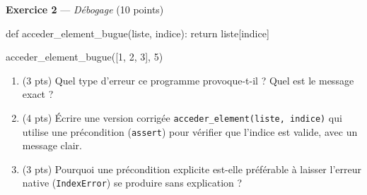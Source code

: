 \bigskip

\textbf{Exercice 2} --- \textit{Débogage} \hfill (10 points)

\begin{python}
def acceder_element_bugue(liste, indice):
    return liste[indice]

acceder_element_bugue([1, 2, 3], 5)
\end{python}

\begin{enumerate}
  \item (3 pts) Quel type d'erreur ce programme provoque-t-il ? Quel est le message exact ?
  \item (4 pts) Écrire une version corrigée \lstinline{acceder_element(liste, indice)} qui utilise une précondition (\lstinline{assert}) pour vérifier que l'indice est valide, avec un message clair.
  \item (3 pts) Pourquoi une précondition explicite est-elle préférable à laisser l'erreur native (\lstinline{IndexError}) se produire sans explication ?
\end{enumerate}

